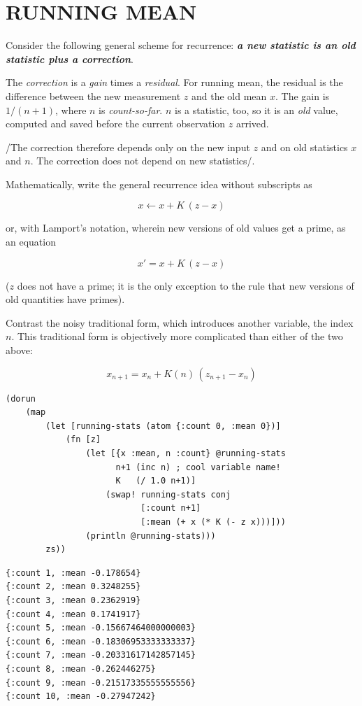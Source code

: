 \documentclass[10pt,oneside,x11names]{article}
\begin{document}
\section{RUNNING MEAN}
\label{running-mean}
Consider the following general scheme for recurrence: \textbf{\emph{a new statistic is an
old statistic plus a correction}}.

The \emph{correction} is a \emph{gain} times a \emph{residual}. For running mean, the
residual is the difference between the new measurement \(z\) and the old
mean \(x\). The gain is \(1/(n+1)\), where \(n\) is \emph{count-so-far}. \(n\) is a
statistic, too, so it is an \emph{old} value, computed and saved before the
current observation \(z\) arrived.

/The correction therefore depends only on the new input \(z\) and on old
statistics \(x\) and \(n\). The correction does not depend on new
statistics/.

Mathematically, write the general recurrence idea without subscripts as

$$x\leftarrow{x+K\,(z-x)}$$

or, with Lamport's notation, wherein new versions of old values get a
prime, as an equation

$$x'=x+K\,(z-x)$$

(\(z\) does not have a prime; it is the only exception to the rule that
new versions of old quantities have primes).

Contrast the noisy traditional form, which introduces another variable,
the index \(n\). This traditional form is objectively more complicated
than either of the two above:

$$x_{n+1}=x_n+K(n)\,(z_{n+1}-x_n)$$

\begin{verbatim}
(dorun
    (map
        (let [running-stats (atom {:count 0, :mean 0})]
            (fn [z]
                (let [{x :mean, n :count} @running-stats
                      n+1 (inc n) ; cool variable name!
                      K   (/ 1.0 n+1)]
                    (swap! running-stats conj
                           [:count n+1]
                           [:mean (+ x (* K (- z x)))]))
                (println @running-stats)))
        zs))
\end{verbatim}

\begin{verbatim}
{:count 1, :mean -0.178654}
{:count 2, :mean 0.3248255}
{:count 3, :mean 0.2362919}
{:count 4, :mean 0.1741917}
{:count 5, :mean -0.15667464000000003}
{:count 6, :mean -0.18306953333333337}
{:count 7, :mean -0.20331617142857145}
{:count 8, :mean -0.262446275}
{:count 9, :mean -0.21517335555555556}
{:count 10, :mean -0.27947242}
\end{verbatim}
\end{document}
